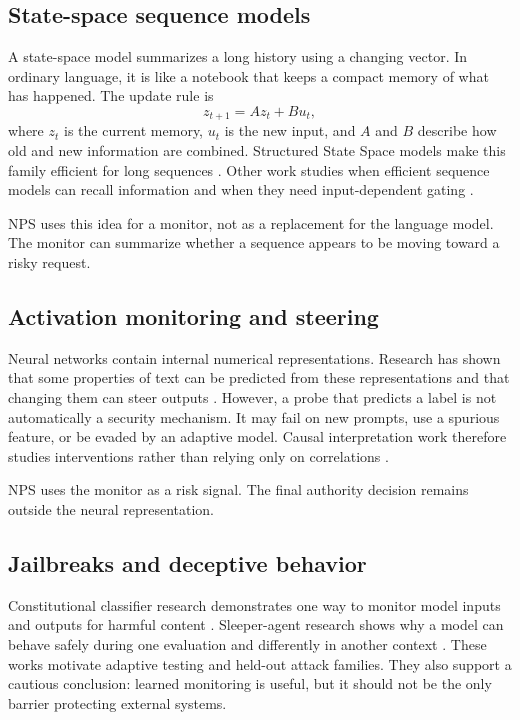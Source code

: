 \documentclass[11pt]{article}
\begin{document}
\subsection{State-space sequence models}
A state-space model summarizes a long history using a changing vector. In ordinary language, it is like a notebook that keeps a compact memory of what has happened. The update rule is
\begin{equation}
 z_{t+1}=A z_t+B u_t,
\end{equation}
where $z_t$ is the current memory, $u_t$ is the new input, and $A$ and $B$ describe how old and new information are combined. Structured State Space models make this family efficient for long sequences \cite{gu2022s4}. Other work studies when efficient sequence models can recall information and when they need input-dependent gating \cite{poli2023zoology}.

NPS uses this idea for a monitor, not as a replacement for the language model. The monitor can summarize whether a sequence appears to be moving toward a risky request.

\subsection{Activation monitoring and steering}
Neural networks contain internal numerical representations. Research has shown that some properties of text can be predicted from these representations and that changing them can steer outputs \cite{turner2023activation}. However, a probe that predicts a label is not automatically a security mechanism. It may fail on new prompts, use a spurious feature, or be evaded by an adaptive model. Causal interpretation work therefore studies interventions rather than relying only on correlations \cite{elhage2022toy}.

NPS uses the monitor as a risk signal. The final authority decision remains outside the neural representation.

\subsection{Jailbreaks and deceptive behavior}
Constitutional classifier research demonstrates one way to monitor model inputs and outputs for harmful content \cite{anthropic2025cc}. Sleeper-agent research shows why a model can behave safely during one evaluation and differently in another context \cite{hubinger2024sleeper}. These works motivate adaptive testing and held-out attack families. They also support a cautious conclusion: learned monitoring is useful, but it should not be the only barrier protecting external systems.
\end{document}
